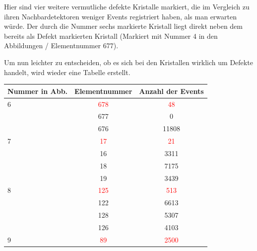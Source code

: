 \documentclass[a4paper,11pt,oneside,final,german,openbib,pdftex]{scrbook}
\begin{document}
{\begin{figure}[h!]
\end{figure}

Hier sind vier weitere vermutliche defekte Kristalle markiert, die im Vergleich zu ihren Nachbardetektoren weniger Events registriert haben, als man erwarten w\"urde. Der durch die Nummer sechs markierte Kristall liegt direkt neben dem bereits als Defekt markierten Kristall (Markiert mit Nummer 4 in den Abbildungen / Elementnummer 677). 
 
 Um nun leichter zu entscheiden, ob es sich bei den Kristallen wirklich um Defekte handelt, wird wieder eine Tabelle erstellt.
 
 
 \begin{table}[h!]
 \begin{center}
 	
 \begin{tabular}{lcc}
 
 	
 	Nummer in Abb. & Elementnummer&Anzahl der Events \\
	 
 	\hline
 	6& \textcolor{red}{678} &\textcolor{red}{48} \\
 	 
 	 & 677&0 \\
 	
 	 & 676& 11808\\ 
 	
 	
 	\hline
 	7& \textcolor{red}{17} &\textcolor{red}{21} \\
 	
 	& 16 & 3311\\
 	
 	& 18& 7175 \\
 	
 	 & 19& 3439 \\
 	
 	\hline
 	
 	8 & \textcolor{red}{125} &\textcolor{red}{513} \\
 	
 	
 	 & 122& 6613\\
 	
 	 & 128 & 5307 \\
 	
 	& 126 & 4103 \\
 	
 	\hline
 	
 	9 & \textcolor{red}{89}& \textcolor{red}{2500}\\
 	

\end{tabular}
\end{center}
\end{table}}
\end{document}
